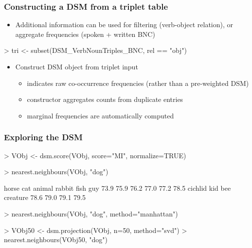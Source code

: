 \documentclass[t]{beamer} %
\begin{document}
\begin{frame}[fragile]
  \frametitle{Constructing a DSM from a triplet table}

  \begin{itemize}
  \item Additional information can be used for filtering (verb-object relation), or aggregate frequencies (spoken + written BNC)
  \end{itemize}

\ungap[.5]
\begin{Rcode}
> tri <- subset(DSM_VerbNounTriples_BNC, rel == "obj")
\end{Rcode}

  \begin{itemize}
  \item Construct DSM object from triplet input
    \begin{itemize}
    \item {} indicates raw co-occurrence frequencies (rather than a pre-weighted DSM)
    \item constructor aggregates counts from duplicate entries
    \item marginal frequencies are automatically computed
    \end{itemize}
  \end{itemize}

\ungap[.5]
\end{frame}

\begin{frame}[fragile]
  \frametitle{Exploring the DSM}

\begin{Rcode}
> VObj <- dsm.score(VObj, score="MI", normalize=TRUE)

> nearest.neighbours(VObj, "dog") \begin{Rout}
   horse      cat   animal   rabbit     fish      guy  
    73.9     75.9     76.2     77.0     77.2     78.5  
 cichlid      kid      bee creature 
    78.6     79.0     79.1     79.5 
\end{Rout}
> nearest.neighbours(VObj, "dog", method="manhattan")

> VObj50 <- dsm.projection(VObj, n=50, method="svd")
> nearest.neighbours(VObj50, "dog")
\end{Rcode}
\end{frame}




\end{document}
